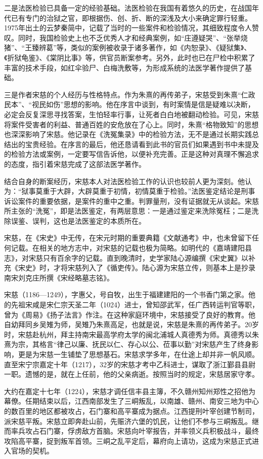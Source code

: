 \documentclass[12pt,UTF8]{ctexbook}
\begin{document}
二是法医检验已具备一定的经验基础。法医检验在我国有着悠久的历史，在战国年代已有专门的治狱之官，即根据伤、创、折、断的深浅及大小来确定罪行轻重。1975年出土的云梦秦简中，记载了当时的一些案件和检验情况，其细致程度令人赞叹。同时，我国检验史上也不乏优秀人才和经典案例，如“庄遵疑哭”、“张举烧猪”、“王臻辨葛”等，类似的案例被收录于诸多著作，如《内恕录》、《疑狱集》、《折狱龟鉴》、《棠阴比事》等，供官员断案参考。另外，此时也已在尸检中积累了丰富的技术手段，如红伞验尸、白梅洗敷等，为形成系统的法医学著作提供了基础。

三是作者宋慈的个人经历与性格特点。作为朱熹的再传弟子，宋慈受到朱熹“仁政民本”、“视民如伤”思想的影响。他在序言中谈到，有时案情是信是疑难以决断，必定会反复深思寻找答案，生怕轻率行事，让死者白白地被翻动检验。可见，宋慈将案件受害者的利益、普通百姓的安危放在了心上。同时，朱熹“格物致知”的思想也深深影响了宋慈。他记录在《洗冤集录》中的检验方法，无不是通过长期实践总结出的宝贵经验。在序言的最后，他还恳请看到此书的官员们如果遇到书中未提及的检验方法或案例，一定要写信告诉他，以便补充完善。正是这种对真理不懈追求的态度，指引着宋慈完成了这部法医学著作。

结合自身的断案经历，宋慈本人对法医检验工作的认识也较前人更为深刻。他认为：“狱事莫重于大辟，大辟莫重于初情，初情莫重于检验。”法医鉴定结论是刑事诉讼案件的重要依据，是案件的重中之重。判罪量刑，没有证据就无从谈起。宋慈所主张的“洗冤”，即是法医鉴定，有两层意思：一是通过鉴定来洗除冤枉；二是洗除误鉴、误判，这也是法医鉴定的本质所在。

宋慈，在《宋史》中无传，在宋元时期的重要典籍《文献通考》中，也未曾留下任何记载。在相关的地方志中，对宋慈的记载也极为简略。如明代的《嘉靖建阳县志》，对宋慈只有百余字的记载。直到晚清时，史学家陆心源编撰《宋史翼》以补充《宋史》时，才将宋慈列入了《循吏传》。陆心源为宋慈立传，则基本上是抄录南宋刘克庄所撰《宋经略墓志铭》。

宋慈（1186—1249），字惠父，号自牧，出生于福建建阳的一个书香门第之家。他的先祖宋咸是宋仁宗天圣二年（1024）进士，曾知邵武军，任广西转运判官等职，曾为《周易》《扬子法言》作注。在这种家庭环境中，宋慈接受了良好的教育。他自幼拜同乡吴雉为师，吴雉乃朱熹高足，也就是说，宋慈是朱熹的再传弟子。20岁时，宋慈赴杭州，拜主持南宋最高学府太学的闽北浦城人真德秀为师。真德秀以朱熹为宗，其格言“律己以廉、抚民以仁、存心以公、莅事以勤”对宋慈产生了终身影响，更是为宋慈一生铺垫了思想基石。宋慈求学多年，在仕途上却并非一帆风顺。直至宋宁宗嘉定十年（1217），32岁的宋慈才考中乙科进士，谋取了浙江鄞县县尉一职。遗憾的是，就在上任前，他的父亲病逝。按照当时的规定，宋慈居家守孝。

大约在嘉定十七年（1224），宋慈才调任信丰县主簿，不久赣州知州郑性之招他为幕僚。任期结束以后，江西南部发生了三峒叛乱，以南雄、赣州、南安三地为中心的数百里的地区都被攻占，石门寨和高平寨成为据点。江西提刑叶宰创建节制司，派宋慈平叛。宋慈立即奔赴山前，先赈济六堡的饥民，让他们不参与三峒叛乱。继而率兵攻占石门寨，俘虏敌方首脑。宋慈向叶宰报告，并率领义兵积极战斗，最终攻陷高平寨，捉到叛军首领。三峒之乱平定后，幕府向上请功，这成为宋慈正式进入官场的契机。
\end{document}
